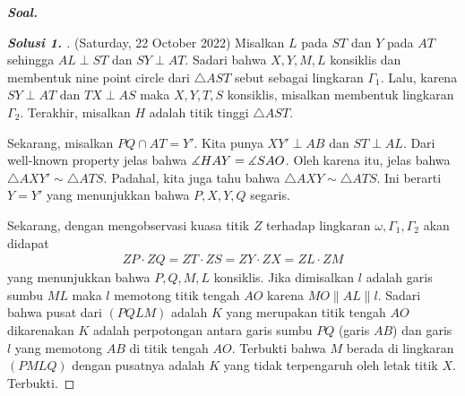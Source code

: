 \textbf{\textit{Soal. }}

\begin{proof}[\textbf{Solusi 1. }] (Saturday, 22 October 2022) Misalkan $L$ pada $ST$ dan $Y$ pada $AT$ sehingga $AL \perp ST$ dan $SY \perp AT$. Sadari bahwa $X,Y,M,L$ konsiklis dan membentuk nine point circle dari $\triangle AST$ sebut sebagai lingkaran $\Gamma_1$. Lalu, karena $SY \perp AT$ dan $TX \perp AS$ maka $X,Y,T,S$ konsiklis, misalkan membentuk lingkaran $\Gamma_2$. Terakhir, misalkan $H$ adalah titik tinggi $\triangle AST$.
% 

Sekarang, misalkan $PQ \cap AT = Y'$. Kita punya $XY' \perp AB$ dan $ST \perp AL$. Dari well-known property jelas bahwa $\measuredangle HAY = \measuredangle SAO$. Oleh karena itu, jelas bahwa $\triangle AXY' \sim \triangle ATS$. Padahal, kita juga tahu bahwa $\triangle AXY \sim \triangle ATS$. Ini berarti $Y=Y'$ yang menunjukkan bahwa $P,X,Y,Q$ segaris.

Sekarang, dengan mengobservasi kuasa titik $Z$ terhadap lingkaran $\omega, \Gamma_1, \Gamma_2$ akan didapat
\begin{align*}
    ZP \cdot ZQ = ZT \cdot ZS = ZY \cdot ZX = ZL \cdot ZM
\end{align*}
yang menunjukkan bahwa $P,Q,M,L$ konsiklis. Jika dimisalkan $l$ adalah garis sumbu $ML$ maka $l$ memotong titik tengah $AO$ karena $MO \parallel AL \parallel l$. Sadari bahwa pusat dari $(PQLM)$ adalah $K$ yang merupakan titik tengah $AO$ dikarenakan $K$ adalah perpotongan antara garis sumbu $PQ$ (garis $AB$) dan garis $l$ yang memotong $AB$ di titik tengah $AO$. Terbukti bahwa $M$ berada di lingkaran $(PMLQ)$ dengan pusatnya adalah $K$ yang tidak terpengaruh oleh letak titik $X$. Terbukti.
\end{proof}




